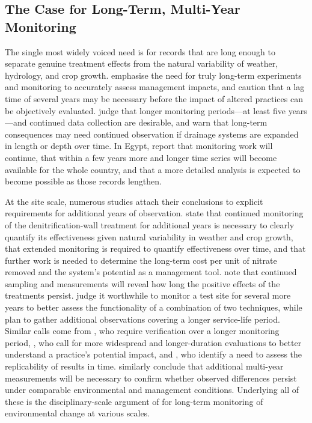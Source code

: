 \documentclass[11pt]{article}
\begin{document}
\subsection{The Case for Long-Term, Multi-Year Monitoring}

The single most widely voiced need is for records that are long enough to separate genuine treatment effects from the natural variability of weather, hydrology, and crop growth. \textcite{Clifford2023} emphasise the need for truly long-term experiments and monitoring to accurately assess management impacts, and \textcite{BUHLER1993} caution that a lag time of several years may be necessary before the impact of altered practices can be objectively evaluated. \textcite{Ali2013} judge that longer monitoring periods---at least five years---and continued data collection are desirable, and warn that long-term consequences may need continued observation if drainage systems are expanded in length or depth over time. In Egypt, \textcite{Ali2001} report that monitoring work will continue, that within a few years more and longer time series will become available for the whole country, and that a more detailed analysis is expected to become possible as those records lengthen.

At the site scale, numerous studies attach their conclusions to explicit requirements for additional years of observation. \textcite{Jaynes2008} state that continued monitoring of the denitrification-wall treatment for additional years is necessary to clearly quantify its effectiveness given natural variability in weather and crop growth, that extended monitoring is required to quantify effectiveness over time, and that further work is needed to determine the long-term cost per unit of nitrate removed and the system's potential as a management tool. \textcite{Dalhem2019} note that continued sampling and measurements will reveal how long the positive effects of the treatments persist. \textcite{Osterholm2005} judge it worthwhile to monitor a test site for several more years to better assess the functionality of a combination of two techniques, while \textcite{ROLLIN1987} plan to gather additional observations covering a longer service-life period. Similar calls come from \textcite{Wesström2015}, who require verification over a longer monitoring period, \textcite{Reinhart2020}, who call for more widespread and longer-duration evaluations to better understand a practice's potential impact, and \textcite{Rijal2012}, who identify a need to assess the replicability of results in time. \textcite{GiménezValero2025} similarly conclude that additional multi-year measurements will be necessary to confirm whether observed differences persist under comparable environmental and management conditions. Underlying all of these is the disciplinary-scale argument of \textcite{SPALING1995} for long-term monitoring of environmental change at various scales.
\end{document}
